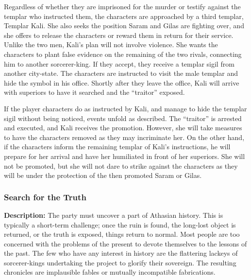 Regardless of whether they are imprisoned for the murder or testify against the templar who instructed them, the characters are approached by a third templar, Templar Kali. She also seeks the position Saram and Gilas are fighting over, and she offers to release the characters or reward them in return for their service. Unlike the two men, Kali's plan will not involve violence. She wants the characters to plant false evidence on the remaining of the two rivals, connecting him to another sorcerer-king. If they accept, they receive a templar sigil from another city-state. The characters are instructed to visit the male templar and hide the symbol in his office. Shortly after they leave the office, Kali will arrive with superiors to have it searched and the ``traitor'' exposed.

If the player characters do as instructed by Kali, and manage to hide the templar sigil without being noticed, events unfold as described. The ``traitor'' is arrested and executed, and Kali receives the promotion. However, she will take measures to have the characters removed as they may incriminate her. On the other hand, if the characters inform the remaining templar of Kali's instructions, he will prepare for her arrival and have her humiliated in front of her superiors. She will not be promoted, but she will not dare to strike against the characters as they will be under the protection of the then promoted Saram or Gilas.

\subsubsection{Search for the Truth}

\textbf{Description:} The party must uncover a part of Athasian history. This is typically a short-term challenge; once the ruin is found, the long-lost object is returned, or the truth is exposed, things return to normal. Most people are too concerned with the problems of the present to devote themselves to the lessons of the past. The few who have any interest in history are the flattering lackeys of sorcerer-kings undertaking the project to glorify their sovereign. The resulting chronicles are implausible fables or mutually incompatible fabrications.

